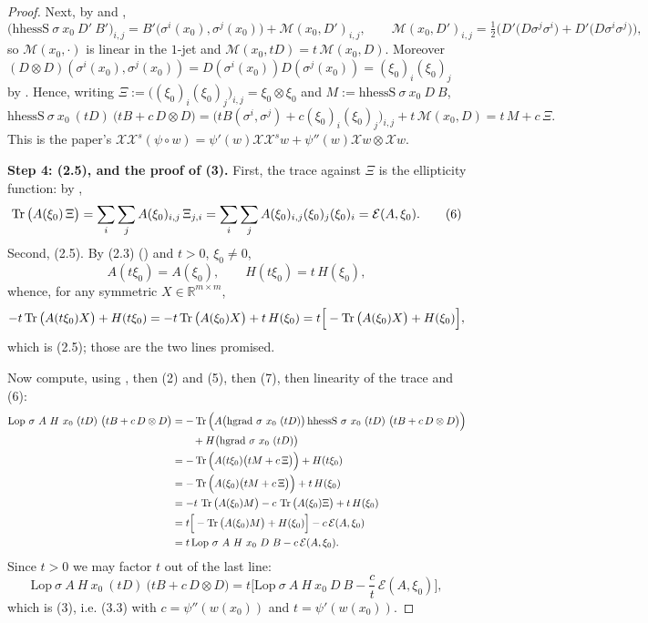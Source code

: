 \begin{proof}
Next, by  and ,
\[
 \big(\mathrm{hhessS}\ \sigma\ x_0\ D'\ B'\big)_{i,j}
 =B'\big(\sigma^{i}(x_0),\sigma^{j}(x_0)\big)+\mathcal M(x_0,D')_{i,j},\qquad
 \mathcal M(x_0,D')_{i,j}=\tfrac12\Big(D'\big(D\sigma^{j}\sigma^{i}\big)+D'\big(D\sigma^{i}\sigma^{j}\big)\Big),
\]
so $\mathcal M(x_0,\cdot)$ is linear in the $1$-jet and $\mathcal M(x_0,tD)=t\,\mathcal M(x_0,D)$.
Moreover $(D\otimes D)(\sigma^{i}(x_0),\sigma^{j}(x_0))=D(\sigma^{i}(x_0))D(\sigma^{j}(x_0))
=(\xi_0)_i(\xi_0)_j$ by . Hence, writing
$\Xi:=\big((\xi_0)_i(\xi_0)_j\big)_{i,j}=\xi_0\otimes\xi_0$ and
$M:=\mathrm{hhessS}\ \sigma\ x_0\ D\ B$,
\[
 \mathrm{hhessS}\ \sigma\ x_0\ (tD)\ \big(tB+c\,D\otimes D\big)
 =\big(tB(\sigma^{i},\sigma^{j})+c(\xi_0)_i(\xi_0)_j\big)_{i,j}+t\,\mathcal M(x_0,D)
 =t\,M+c\,\Xi . \tag{5}
\]
This is the paper's
$\mathcal X\mathcal X^{s}(\psi\circ w)=\psi'(w)\mathcal X\mathcal X^{s}w+\psi''(w)\mathcal Xw\otimes\mathcal Xw$.

\medskip\noindent\textbf{Step 4: (2.5), and the proof of (3).} First, the trace against
$\Xi$ is the ellipticity function: by ,
\[
 \operatorname{Tr}\big(A(\xi_0)\,\Xi\big)=\sum_i\sum_j A(\xi_0)_{i,j}\,\Xi_{j,i}
 =\sum_i\sum_j A(\xi_0)_{i,j}(\xi_0)_j(\xi_0)_i=\mathcal E(A,\xi_0). \tag{6}
\]
Second, (2.5). By (2.3) () and $t>0$, $\xi_0\ne0$,
\[
 A(t\xi_0)=A(\xi_0),\qquad H(t\xi_0)=t\,H(\xi_0), \tag{7}
\]
whence, for any symmetric $X\in\mathbb R^{m\times m}$,
\[
 -t\operatorname{Tr}\big(A(t\xi_0)X\big)+H(t\xi_0)=-t\operatorname{Tr}\big(A(\xi_0)X\big)+t\,H(\xi_0)
 =t\Big[-\operatorname{Tr}\big(A(\xi_0)X\big)+H(\xi_0)\Big],
\]
which is (2.5); those are the two lines promised.

Now compute, using , then (2) and (5), then (7), then linearity of the trace
and (6):
\begin{align*}
 \mathrm{Lop}\ \sigma\ A\ H\ x_0\ (tD)\ \big(tB+c\,D\otimes D\big)
 &=-\operatorname{Tr}\Big(A\big(\mathrm{hgrad}\ \sigma\ x_0\ (tD)\big)\,
    \mathrm{hhessS}\ \sigma\ x_0\ (tD)\ \big(tB+c\,D\otimes D\big)\Big)\\
 &\qquad+H\big(\mathrm{hgrad}\ \sigma\ x_0\ (tD)\big)\\
 &=-\operatorname{Tr}\Big(A(t\xi_0)\big(tM+c\,\Xi\big)\Big)+H(t\xi_0)\\
 &=-\operatorname{Tr}\Big(A(\xi_0)\big(tM+c\,\Xi\big)\Big)+t\,H(\xi_0)\\
 &=-t\,\operatorname{Tr}\big(A(\xi_0)M\big)-c\,\operatorname{Tr}\big(A(\xi_0)\Xi\big)+t\,H(\xi_0)\\
 &=t\Big[-\operatorname{Tr}\big(A(\xi_0)M\big)+H(\xi_0)\Big]-c\,\mathcal E(A,\xi_0)\\
 &=t\,\mathrm{Lop}\ \sigma\ A\ H\ x_0\ D\ B-c\,\mathcal E(A,\xi_0).
\end{align*}
Since $t>0$ we may factor $t$ out of the last line:
\[
 \mathrm{Lop}\ \sigma\ A\ H\ x_0\ (tD)\ \big(tB+c\,D\otimes D\big)
 =t\Big[\mathrm{Lop}\ \sigma\ A\ H\ x_0\ D\ B-\frac ct\,\mathcal E(A,\xi_0)\Big],
\]
which is (3), i.e. (3.3) with $c=\psi''(w(x_0))$ and $t=\psi'(w(x_0))$.


\end{proof}
